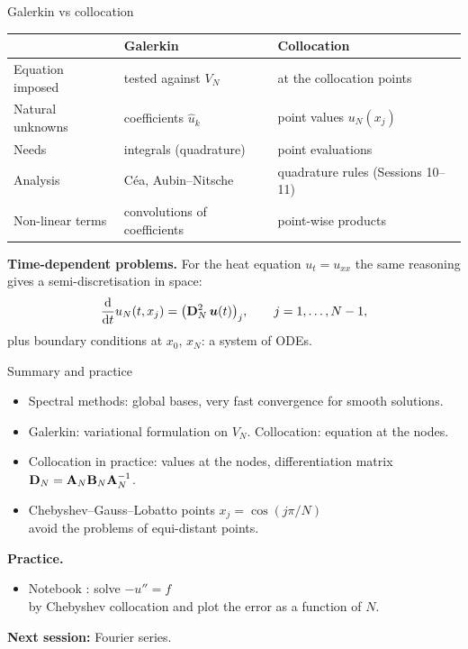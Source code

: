 \begin{frame}{Galerkin vs collocation}
    \begin{center}
        \begin{tabular}{@{}lll@{}}
            \toprule
                             & Galerkin                     & Collocation                        \\
            \midrule
            Equation imposed & tested against $V_N$         & at the collocation points          \\
            Natural unknowns & coefficients $\hat u_k$      & point values $u_N(x_j)$            \\
            Needs            & integrals (quadrature)       & point evaluations                  \\
            Analysis         & Céa, Aubin--Nitsche          & quadrature rules (Sessions 10--11) \\
            Non-linear terms & convolutions of coefficients & point-wise products                \\
            \bottomrule
        \end{tabular}
    \end{center}
    \bigskip
    \textbf{Time-dependent problems.} For the heat equation $u_t = u_{xx}$ the same reasoning\\ gives a semi-discretisation in space:
    \[
        \frac{{\mathrm d}}{{\mathrm d} t} u_N(t, x_j) = \big(\mathbf{D}_N^2\, \bm{u}(t)\big)_j, \qquad j = 1, \dots, N-1,
    \]
    plus boundary conditions at $x_0$, $x_N$: a system of ODEs.
\end{frame}

\begin{frame}{Summary and practice}
    \begin{itemize}
        \item Spectral methods: global bases, very fast convergence for smooth solutions.
        \item Galerkin: variational formulation on $V_N$. Collocation: equation at the nodes.
        \item Collocation in practice: values at the nodes, differentiation matrix $\mathbf{D}_N = \mathbf{A}_N \mathbf{B}_N \mathbf{A}_N^{-1}$.
        \item Chebyshev--Gauss--Lobatto points $x_j = \cos(j\pi/N)$\\ avoid the problems of equi-distant points.
    \end{itemize}
    \bigskip
    \textbf{Practice.}
    \begin{itemize}
        \item Notebook : solve $-u'' = f$\\ by Chebyshev collocation and plot the error as a function of $N$.
    \end{itemize}
    \bigskip
    \textbf{Next session:} Fourier series.
\end{frame}
